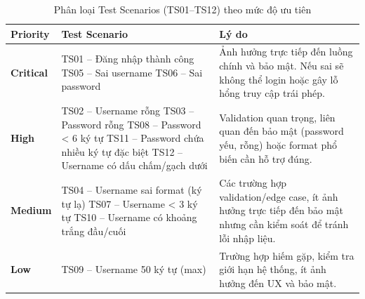 \documentclass[a4paper,12pt]{article}
\begin{document}
\begin{table}[h!]
\centering
\begin{tabularx}{\textwidth}{|p{2.2cm}|>{\raggedright\arraybackslash}X|>{\raggedright\arraybackslash}X|}
\hline
\textbf{Priority} & \textbf{Test Scenario} & \textbf{Lý do} \\
\hline

\textbf{Critical} &
TS01 – Đăng nhập thành công \newline
TS05 – Sai username \newline
TS06 – Sai password &
Ảnh hưởng trực tiếp đến luồng chính và bảo mật. Nếu sai sẽ không thể login hoặc gây lỗ hổng truy cập trái phép. \\
\hline

\textbf{High} &
TS02 – Username rỗng \newline
TS03 – Password rỗng \newline
TS08 – Password < 6 ký tự \newline
TS11 – Password chứa nhiều ký tự đặc biệt \newline
TS12 – Username có dấu chấm/gạch dưới &
Validation quan trọng, liên quan đến bảo mật (password yếu, rỗng) hoặc format phổ biến cần hỗ trợ đúng. \\
\hline

\textbf{Medium} &
TS04 – Username sai format (ký tự lạ) \newline
TS07 – Username < 3 ký tự \newline
TS10 – Username có khoảng trắng đầu/cuối &
Các trường hợp validation/edge case, ít ảnh hưởng trực tiếp đến bảo mật nhưng cần kiểm soát để tránh lỗi nhập liệu. \\
\hline

\textbf{Low} &
TS09 – Username 50 ký tự (max) &
Trường hợp hiếm gặp, kiểm tra giới hạn hệ thống, ít ảnh hưởng đến UX và bảo mật. \\
\hline
\end{tabularx}
\caption{Phân loại Test Scenarios (TS01–TS12) theo mức độ ưu tiên}
\end{table}
\end{document}
